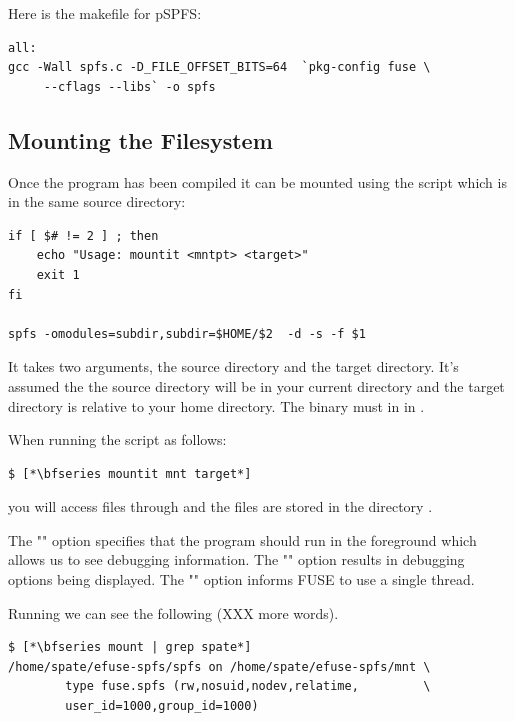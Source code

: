 \noindent
Here is the makefile for pSPFS:

\begin{lstlisting}
all:
gcc -Wall spfs.c -D_FILE_OFFSET_BITS=64  `pkg-config fuse \
     --cflags --libs` -o spfs
\end{lstlisting}


\subsection{Mounting the Filesystem}

Once the program has been compiled it can be mounted using the  script which is in the same source directory:

\begin{lstlisting}
if [ $# != 2 ] ; then
    echo "Usage: mountit <mntpt> <target>"
    exit 1
fi

spfs -omodules=subdir,subdir=$HOME/$2  -d -s -f $1
\end{lstlisting}

\noindent
It takes two arguments, the source directory and the target directory. It's assumed the the source directory will be in your current directory and the target directory is relative to your home directory. The  binary must in in .

When running the script as follows:

\begin{lstlisting}
$ [*\bfseries mountit mnt target*]
\end{lstlisting}

\noindent
you will access files through  and the files are stored in the directory .

The "" option specifies that the program should run in the foreground which allows us to see debugging information. The "" option results in debugging options being displayed. The "" option informs FUSE to use a single thread.

Running  we can see the following (XXX more words).

\begin{lstlisting}
$ [*\bfseries mount | grep spate*]
/home/spate/efuse-spfs/spfs on /home/spate/efuse-spfs/mnt \
        type fuse.spfs (rw,nosuid,nodev,relatime,         \
        user_id=1000,group_id=1000)
\end{lstlisting}

